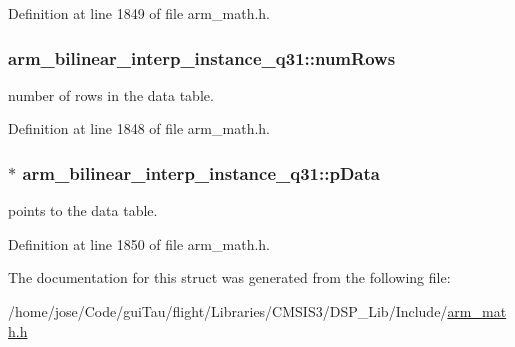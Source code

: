 Definition at line 1849 of file arm\-\_\-math.\-h.

\hypertarget{structarm__bilinear__interp__instance__q31_a2082e3eac56354d75291f03e96ce4aa5}{
\subsubsection[{num\-Rows}]{ arm\-\_\-bilinear\-\_\-interp\-\_\-instance\-\_\-q31\-::num\-Rows}}\label{structarm__bilinear__interp__instance__q31_a2082e3eac56354d75291f03e96ce4aa5}
number of rows in the data table. 

Definition at line 1848 of file arm\-\_\-math.\-h.

\hypertarget{structarm__bilinear__interp__instance__q31_a843eae0c9db5f815e77e1aaf9afea358}{
\subsubsection[{p\-Data}]{$\ast$ arm\-\_\-bilinear\-\_\-interp\-\_\-instance\-\_\-q31\-::p\-Data}}\label{structarm__bilinear__interp__instance__q31_a843eae0c9db5f815e77e1aaf9afea358}
points to the data table. 

Definition at line 1850 of file arm\-\_\-math.\-h.



The documentation for this struct was generated from the following file\-:\begin{DoxyCompactItemize}
\item 
/home/jose/\-Code/gui\-Tau/flight/\-Libraries/\-C\-M\-S\-I\-S3/\-D\-S\-P\-\_\-\-Lib/\-Include/\hyperlink{arm__math_8h}{arm\-\_\-math.\-h}\end{DoxyCompactItemize}
